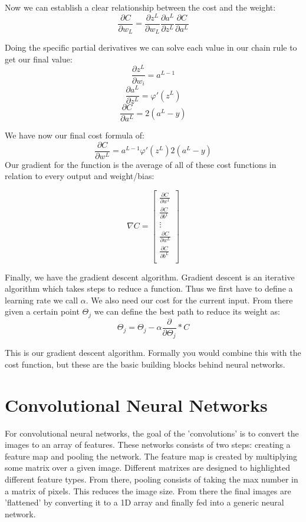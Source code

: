 \documentclass[12pt]{article}
\begin{document}
 Now we can establish a clear relationship between the cost and the weight:
 $$
 \frac{\partial C}{\partial w_L} = \frac{\partial z^L}{\partial w_L} \frac{\partial a^L}{\partial z^L} \frac{\partial C}{\partial a^L}
 $$
 
 Doing the specific partial derivatives we can solve each value in our chain rule to get our final value:
 $$\frac{\partial z^L}{\partial w_i} = a^{L-1}$$
 $$\frac{\partial a^L}{\partial z^L} = \varphi'(z^L)$$
 $$ \frac{\partial C}{\partial a^L} = 2(a^L-y)$$
 
 We have now our final cost formula of:
 $$
  \frac{\partial C}{\partial w^L} = a^{L-1} \varphi'(z^L) 2(a^L-y)
 $$
 \newpage
 Our gradient for the function is the average of all of these cost functions in relation to every output and weight/bias:

 
 \[
 \nabla C = \begin{bmatrix} 
      \frac{\partial C}{\partial w^1} \\
      \frac{\partial C}{\partial b^1} \\
    \vdots  \\
     \frac{\partial C}{\partial w^L} \\
      \frac{\partial C}{\partial b^L} \\
    \end{bmatrix}
\]
 
 Finally, we have the gradient descent algorithm. Gradient descent is an iterative algorithm which takes steps to reduce a function. Thus we first have to define a learning rate we call $\alpha$. We also need our cost for the current input. From there given a certain point $\Theta_j$ we can define the best path to reduce its weight as:
 $$
 \Theta_j = \Theta_j - \alpha\frac{\partial }{\partial \Theta_j} *C
 $$
 
 This is our gradient descent algorithm. Formally you would combine this with the cost function, but these are the basic building blocks behind neural networks.

\vspace{-4ex}
\section*{Convolutional Neural Networks}
\vspace{-3ex}

For convolutional neural networks, the goal of the 'convolutions' is to convert the images to an array of features. These networks consists of two steps: creating a feature map and pooling the network. The feature map is created by multiplying some matrix over a given image. Different matrixes are designed to highlighted different feature types. From there, pooling consists of taking the max number in a matrix of pixels. This reduces the image size. From there the final images are 'flattened' by converting it to a 1D array and finally fed into a generic neural network.
\end{document}
